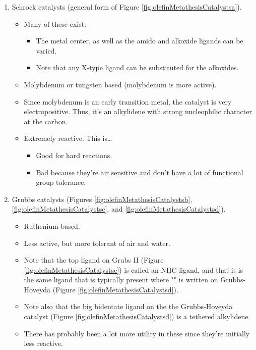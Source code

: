 \documentclass[../notes.tex]{subfiles}
\begin{document}
\begin{itemize}
\begin{enumerate}
        \item Schrock catalysts (general form of Figure \ref{fig:olefinMetathesisCatalystsa}).
        \begin{itemize}
            \item Many of these exist.
            \begin{itemize}
                \item The metal center, as well as the amido and alkoxide ligands can be varied.
                \item Note that any X-type ligand can be substituted for the alkoxides.
            \end{itemize}
            \item Molybdenum or tungsten based (molybdenum is more active).
            \item Since molybdenum is an early transition metal, the catalyst is very electropositive. Thus, it's an alkylidene with strong nucleophilic character at the carbon.
            \item Extremely reactive. This is\dots
            \begin{itemize}
                \item Good for hard reactions.
                \item Bad because they're air sensitive and don't have a lot of functional group tolerance.
            \end{itemize}
        \end{itemize}
        \item Grubbs catalysts (Figures \ref{fig:olefinMetathesisCatalystsb}, \ref{fig:olefinMetathesisCatalystsc}, and \ref{fig:olefinMetathesisCatalystsd}).
        \begin{itemize}
            \item Ruthenium based.
            \item Less active, but more tolerant of air and water.
            \item Note that the top ligand on Grubs II (Figure \ref{fig:olefinMetathesisCatalystsc}) is called an NHC ligand, and that it is the same ligand that is typically present where "" is written on Grubbs-Hoveyda (Figure \ref{fig:olefinMetathesisCatalystsd}).
            \item Note also that the big bidentate ligand on the the Grubbs-Hoveyda catalyst (Figure \ref{fig:olefinMetathesisCatalystsd}) is a tethered alkylidene.
            \item There has probably been a lot more utility in these since they're initially less reactive.

\end{itemize}
\end{enumerate}
\end{itemize}
\end{document}
